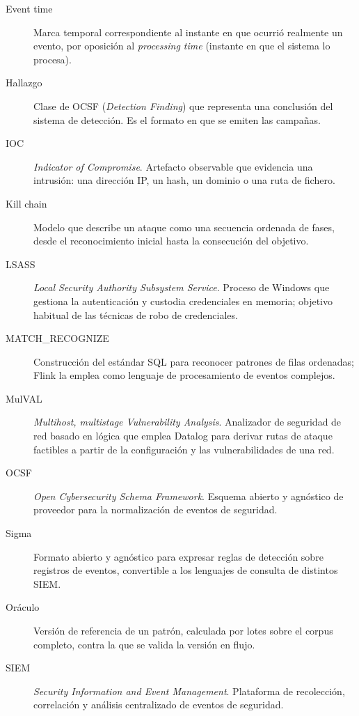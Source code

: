 \begin{description}
\item[Event time] Marca temporal correspondiente al instante en que ocurrió realmente un
evento, por oposición al \textit{processing time} (instante en que el sistema lo procesa).

\item[Hallazgo] Clase de OCSF (\textit{Detection Finding}) que representa una conclusión del
sistema de detección. Es el formato en que se emiten las campañas.

\item[IOC] \textit{Indicator of Compromise}. Artefacto observable que evidencia una
intrusión: una dirección IP, un hash, un dominio o una ruta de fichero.

\item[Kill chain] Modelo que describe un ataque como una secuencia ordenada de fases, desde
el reconocimiento inicial hasta la consecución del objetivo.

\item[LSASS] \textit{Local Security Authority Subsystem Service}. Proceso de Windows que
gestiona la autenticación y custodia credenciales en memoria; objetivo habitual de las
técnicas de robo de credenciales.

\item[MATCH\_RECOGNIZE] Construcción del estándar SQL para reconocer patrones de filas
ordenadas; Flink la emplea como lenguaje de procesamiento de eventos complejos.

\item[MulVAL] \textit{Multihost, multistage Vulnerability Analysis}. Analizador de
seguridad de red basado en lógica que emplea Datalog para derivar rutas de ataque
factibles a partir de la configuración y las vulnerabilidades de una red.

\item[OCSF] \textit{Open Cybersecurity Schema Framework}. Esquema abierto y agnóstico de
proveedor para la normalización de eventos de seguridad.

\item[Sigma] Formato abierto y agnóstico para expresar reglas de detección sobre registros
de eventos, convertible a los lenguajes de consulta de distintos SIEM.

\item[Oráculo] Versión de referencia de un patrón, calculada por lotes sobre el corpus completo,
contra la que se valida la versión en flujo.

\item[SIEM] \textit{Security Information and Event Management}. Plataforma de recolección,
correlación y análisis centralizado de eventos de seguridad.


\end{description}
